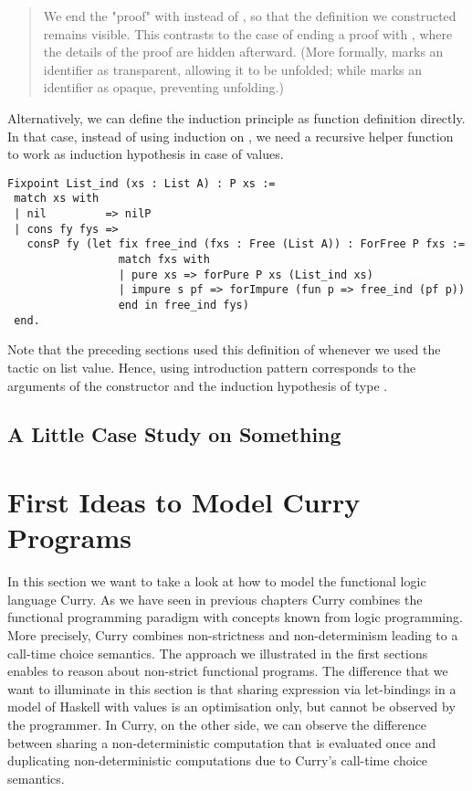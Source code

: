 \begin{quote}
We end the "proof" with  instead of , so that
the definition we constructed remains visible.
This contrasts to the case of ending a proof with , where
the details of the proof are hidden afterward.
(More formally,  marks an identifier as transparent,
allowing it to be unfolded; while  marks an identifier as
opaque, preventing unfolding.)
\end{quote}

Alternatively, we can define the induction principle as function
definition directly.
In that case, instead of using induction on , we need a
recursive helper function  to work as induction
hypothesis in case of  values.

\begin{verbatim}
Fixpoint List_ind (xs : List A) : P xs :=
 match xs with
 | nil         => nilP
 | cons fy fys =>
   consP fy (let fix free_ind (fxs : Free (List A)) : ForFree P fxs :=
                 match fxs with
                 | pure xs => forPure P xs (List_ind xs)
                 | impure s pf => forImpure (fun p => free_ind (pf p))
                 end in free_ind fys)
 end.
\end{verbatim}

Note that the preceding sections used this definition of
 whenever we used the tactic  on list
value.
Hence, using introduction pattern \cinl{[ | fy fys IH ]} corresponds
to the arguments of the  constructor and the induction
hypothesis of type .

\subsection{A Little Case Study on Something}

\section{First Ideas to Model Curry Programs}

In this section we want to take a look at how to model the functional
logic language Curry.
As we have seen in previous chapters Curry combines the functional
programming paradigm with concepts known from logic programming.
More precisely, Curry combines non-strictness and non-determinism
leading to a call-time choice semantics.
The approach we illustrated in the first sections enables to reason
about non-strict functional programs.
The difference that we want to illuminate in this section is that
sharing expression via let-bindings in a model of Haskell with
 values is an optimisation only, but cannot be
observed by the programmer.
In Curry, on the other side, we can observe the difference between
sharing a non-deterministic computation that is evaluated once and
duplicating non-deterministic computations due to Curry's call-time
choice semantics.

